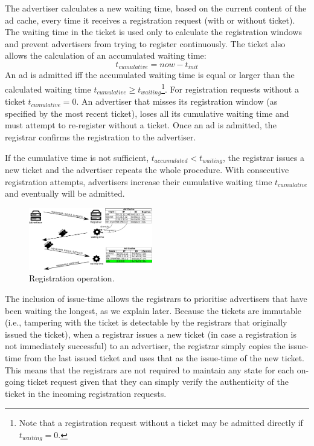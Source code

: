 The advertiser calculates a new waiting time, based on the current content of
the ad cache, every time it receives a registration request (with or without
ticket). The waiting time in the ticket is used only to calculate the
registration windows and prevent advertisers from trying to register
continuously. The ticket also allows the calculation of an accumulated waiting time:
\begin{equation}
    t_\textit{cumulative} = \textit{now} - t_\textit{init}
\end{equation}
An ad is admitted iff the accumulated waiting time is equal or larger than the calculated waiting time $t_\textit{cumulative} \ge t_\textit{waiting}$\footnote{Note that a registration request without a ticket may be admitted directly if $t_\textit{waiting}=0$.}. For registration requests without a ticket $t_\textit{cumulative} = 0$. An advertiser that misses its registration window (as specified by the most recent ticket), loses all its cumulative waiting time and must attempt to re-register without a ticket. Once an ad is admitted, the registrar confirms the registration to the advertiser.

If the cumulative time is not sufficient, $t_\textit{accumulated} < t_\textit{waiting}$, the registrar issues a new ticket and the advertiser repeats the whole procedure. With consecutive registration attempts, advertisers increase their cumulative waiting time $t_\textit{cumulative}$ and eventually will be admitted. 


\begin{figure}
    \includegraphics[width=0.48\textwidth]{img/registration}
    \caption{Registration operation.}
    \label{fig:registration}
\end{figure}

The inclusion of issue-time allows the registrars to prioritise advertisers
that have been waiting the longest, as we explain later. Because the tickets
are immutable (i.e., tampering with the ticket is detectable by the registrars
that originally issued the ticket), when a registrar issues a new ticket (in
case a registration is not immediately successful) to an advertiser, the
registrar simply copies the issue-time from the last issued ticket and uses that as the issue-time of the new ticket. This means that the registrars are not required to maintain any state for each on-going ticket request given that they can simply verify the authenticity of the ticket in the incoming registration requests.



